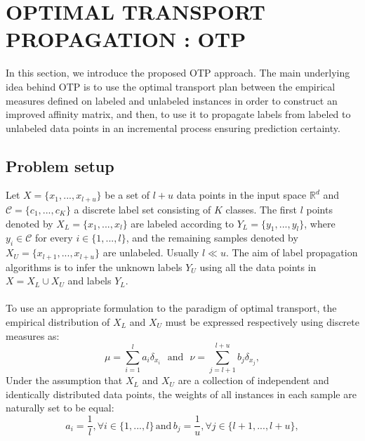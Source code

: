 \documentclass[conference]{IEEEtran}
\begin{document}
\section{OPTIMAL TRANSPORT PROPAGATION : OTP}
In this section, we introduce the proposed OTP
approach. The main underlying idea behind OTP is to use the optimal transport plan between the empirical measures defined on labeled and unlabeled instances in order to construct an improved affinity matrix, and then, to use it to propagate labels from labeled to unlabeled data points in an incremental process ensuring prediction certainty.
\subsection{Problem setup}
Let $X=\{x_1,...,x_{l+u}\}$ be a set of $l+u$ data points in  the input space $\mathbb{R}^d$ and $\mathcal{C} =\{c_1,...,c_K\}$ a discrete label set consisting of $K$ classes. The first $l$ points denoted by $X_L=\{x_1,...,x_l\}$ are labeled according to $Y_L=\{y_1,...,y_l\}$, where $y_i \in \mathcal{C}$ for every $i \in \{1,...,l\}$, and the remaining samples denoted by $X_U=\{x_{l+1},...,x_{l+u}\}$ are unlabeled. Usually $l \ll u$. The aim of label propagation algorithms is to infer the unknown labels $Y_U$ using all the data points in $X=X_L \cup X_U$ and labels $Y_L$.
\\
\\ To use an appropriate formulation to the paradigm of optimal transport, the empirical distribution of $X_L$ and $X_U$ must be expressed respectively using discrete measures as:
\begin{equation}
\mu = \sum_{i=1}^l a_{i} \delta_{x_{i}} \, \, \,\, \text{and} \, \, \,\, \nu = \sum_{j=l+1}^{l+u} b_{j} \delta_{x_{j}},
\end{equation}
Under the assumption that $X_L$ and $X_U$ are a collection of independent and identically distributed data points, the weights of all instances in each sample are naturally set to be equal:
\begin{equation} a_i = \frac{1}{l},\forall i \in \{1,...,l\} \, \text{and} \, b_j = \frac{1}{u},\forall j \in \{l+1,...,l+u\},
\end{equation}
\end{document}
